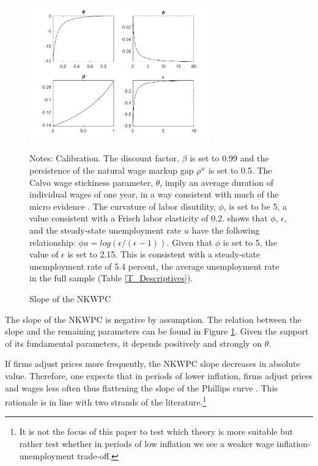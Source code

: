 \documentclass[12pt]{article}
\newcommand{\annote}[1]{\parbox{\textwidth}{\renewcommand{\baselinestretch}{1.0}\vspace{12pt} \footnotesize Notes: #1}}
\begin{document}
\begin{appendices}
\begin{figure}[ht!]
	\centering
	\caption{Slope of the NKWPC \label{F:NKWPCslope}}
	\includegraphics[width=0.7\textwidth]{../Output/Figures/NKWPCslope.pdf} 
	\annote{\footnotesize Calibration. The discount factor, $\beta$ is set to 0.99 and the persistence of the natural wage markup gap $\rho^w$ is set to 0.5. The Calvo wage stickiness parameter, $\theta$, imply an average duration of individual wages of one year, in a way consistent with much of the micro evidence \cite{Nakamura2008}. The curvature of labor disutility, $\phi$, is set to be 5, a value consistent with a Frisch labor elasticity of 0.2. \cite{Gali2011} shows that $\phi$, $\epsilon$, and the steady-state unemployment rate $u$ have the following relationship: $\phi u = log(\epsilon / (\epsilon -1))$. Given that $\phi$ is set to 5, the value of $\epsilon$ is set to 2.15. This is consistent with a steady-state unemployment rate of 5.4 percent, the average unemployment rate in the full sample (Table \ref{T_Descriptives}). }
\end{figure}


The slope of the NKWPC is negative by assumption. The relation between the slope and the remaining parameters can be found in Figure \ref{F:NKWPCslope}. Given the support of its fundamental parameters, it depends positively and strongly on $\theta$. 

If firms adjust prices more frequently, the NKWPC slope decreases in absolute value. Therefore, one expects that in periods of lower inflation, firms adjust prices and wages less often thus flattening the slope of the Phillips curve \citep{Benati2007}. This rationale is in line with two strands of the literature.\footnote{It is not the focus of this paper to test which theory is more suitable but rather test whether in periods of low inflation we see a weaker wage inflation-unemployment trade-off.}


\end{appendices}
\end{document}
